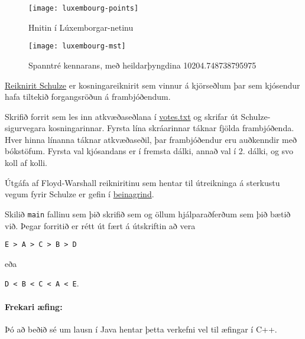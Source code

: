 \documentclass{article}
\begin{document}
\begin{figure}[h]
	\caption{Hnitin í Lúxemborgar-netinu}
	\begin{center}
		\texttt{[image: luxembourg-points]}
	\end{center}
\end{figure}

\begin{figure}
	\caption{Spanntré kennarans, með heildarþyngdina 10204.748738795975}
	\begin{center}
		\texttt{[image: luxembourg-mst]}
	\end{center}
\end{figure}

\clearpage

\question

\href{https://en.wikipedia.org/wiki/Schulze_method}{Reiknirit Schulze} er kosningareiknirit sem vinnur á kjörseðlum þar sem kjósendur hafa tiltekið forgangsröðun á frambjóðendum.

Skrifið forrit sem les inn atkvæðaseðlana í \href{https://raw.githubusercontent.com/Ernir/kennsluefni/master/T2/Code/w12/votes.txt}{votes.txt} og skrifar út Schulze-sigurvegara kosningarinnar. Fyrsta lína skráarinnar táknar fjölda frambjóðenda. Hver hinna línanna táknar atkvæðaseðil, þar frambjóðendur eru auðkenndir með bókstöfum. Fyrsta val kjósandans er í fremsta dálki, annað val í 2. dálki, og svo koll af kolli.

Útgáfa af Floyd-Warshall reikniritinu sem hentar til útreikninga á sterkustu vegum fyrir Schulze er gefin í \href{https://raw.githubusercontent.com/Ernir/kennsluefni/master/T2/Code/w12/Schulze.java}{beinagrind}.

Skilið \texttt{main} fallinu sem þið skrifið sem og öllum hjálparaðferðum sem þið bætið við. Þegar forritið er rétt út fært á útskriftin að vera
\begin{center}
	\texttt{E > A > C > B > D}
\end{center} 
eða
\begin{center}
	\texttt{D < B < C < A < E}.
\end{center}

\paragraph{Frekari æfing:} Þó að beðið sé um lausn í Java hentar þetta verkefni vel til æfingar í C++. 

\end{document}
